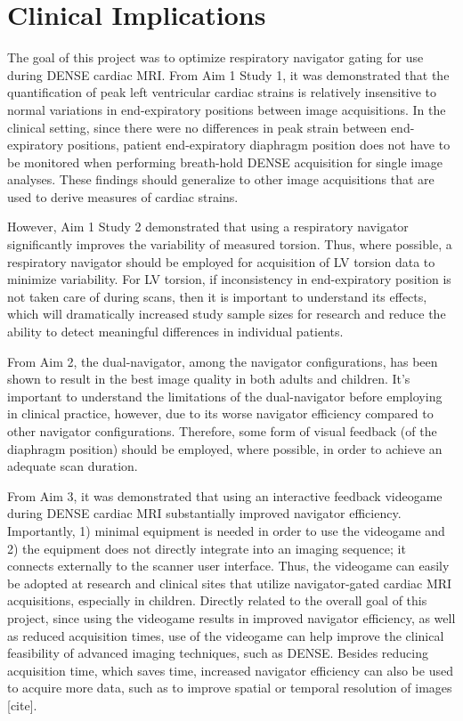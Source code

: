 \section{Clinical Implications}
	The goal of this project was to optimize respiratory navigator gating for use during DENSE cardiac MRI. From Aim 1 Study 1, it was demonstrated that the quantification of peak left ventricular cardiac strains is relatively insensitive to normal variations in end-expiratory positions between image acquisitions. In the clinical setting, since there were no differences in peak strain between end-expiratory positions, patient end-expiratory diaphragm position does not have to be monitored when performing breath-hold DENSE acquisition for single image analyses. These findings should generalize to other image acquisitions that are used to derive measures of cardiac strains.

	However, Aim 1 Study 2 demonstrated that using a respiratory navigator significantly improves the variability of measured torsion. Thus, where possible, a respiratory navigator should be employed for acquisition of LV torsion data to minimize variability. For LV torsion, if inconsistency in end-expiratory position is not taken care of during scans, then it is important to understand its effects, which will dramatically increased study sample sizes for research and reduce the ability to detect meaningful differences in individual patients.

	From Aim 2, the dual-navigator, among the navigator configurations, has been shown to result in the best image quality in both adults and children. It's important to understand the limitations of the dual-navigator before employing in clinical practice, however, due to its worse navigator efficiency compared to other navigator configurations. Therefore, some form of visual feedback (of the diaphragm position) should be employed, where possible, in order to achieve an adequate scan duration.

	From Aim 3, it was demonstrated that using an interactive feedback videogame during DENSE cardiac MRI substantially improved navigator efficiency. Importantly, 1) minimal equipment is needed in order to use the videogame and 2) the equipment does not directly integrate into an imaging sequence; it connects externally to the scanner user interface. Thus, the videogame can easily be adopted at research and clinical sites that utilize navigator-gated cardiac MRI acquisitions, especially in children. Directly related to the overall goal of this project, since using the videogame results in improved navigator efficiency, as well as reduced acquisition times, use of the videogame can help improve the clinical feasibility of advanced imaging techniques, such as DENSE. Besides reducing acquisition time, which saves time, increased navigator efficiency can also be used to acquire more data, such as to improve spatial or temporal resolution of images [cite]. 

